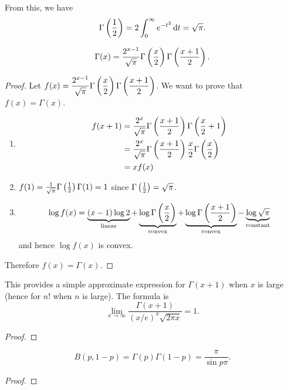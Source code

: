 From this, we have
\[\Gamma\left(\frac{1}{2}\right)=2\int_0^\infty e^{-t^2}\dd{t=\sqrt{\pi}.}\]

\begin{lemma}
\[\Gamma(x)=\frac{2^{x-1}}{\sqrt{\pi}}\Gamma\left(\frac{x}{2}\right)\Gamma\left(\frac{x+1}{2}\right).\]
\end{lemma}

\begin{proof}
Let $\displaystyle f(x)=\frac{2^{x-1}}{\sqrt{\pi}}\Gamma\left(\frac{x}{2}\right)\Gamma\left(\frac{x+1}{2}\right)$. We want to prove that $f(x)=\Gamma(x)$.
\begin{enumerate}[label=(\arabic*)]
\item \begin{align*}
f(x+1)&=\frac{2^x}{\sqrt{\pi}}\Gamma\left(\frac{x+1}{2}\right)\Gamma\left(\frac{x}{2}+1\right)\\
&=\frac{2^x}{\sqrt{\pi}}\Gamma\left(\frac{x+1}{2}\right)\frac{x}{2}\Gamma\left(\frac{x}{2}\right)\\
&=xf(x)
\end{align*}
\item $f(1)=\frac{1}{\sqrt{\pi}}\Gamma\left(\frac{1}{2}\right)\Gamma(1)=1$ since $\Gamma\left(\frac{1}{2}\right)=\sqrt{\pi}$.
\item \[\log f(x)=\underbrace{(x-1)\log2}_\text{linear}+\underbrace{\log\Gamma\left(\frac{x}{2}\right)}_\text{convex}+\underbrace{\log\Gamma\left(\frac{x+1}{2}\right)}_\text{convex}-\underbrace{\log\sqrt{\pi}}_\text{constant}\]
and hence $\log f(x)$ is convex.
\end{enumerate}
Therefore $f(x)=\Gamma(x)$.
\end{proof}

\begin{theorem}
This provides a simple approximate expression for $\Gamma(x+1)$ when $x$ is large (hence for $n!$ when $n$ is large). The formula is
\begin{equation}
\lim_{x\to\infty}\frac{\Gamma(x+1)}{(x/e)^x\sqrt{2\pi x}}=1.
\end{equation}
\end{theorem}

\begin{proof}

\end{proof}

\begin{lemma}
\[B(p,1-p)=\Gamma(p)\Gamma(1-p)=\frac{\pi}{\sin p\pi}.\]
\end{lemma}

\begin{proof}

\end{proof}